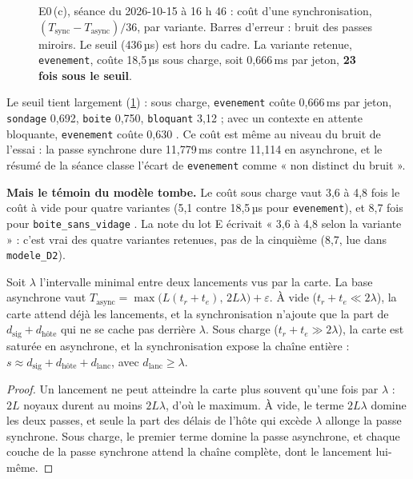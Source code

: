 \begin{figure}[ht]
\centering
\GrapheChmSync
\caption[E0\,(c) : coût d'une synchronisation, à vide et sous charge]{E0\,(c), séance du 2026-10-15 à 16 h 46 \mes : coût d'une synchronisation, $(T_{\mathrm{sync}} - T_{\mathrm{async}})/36$, par variante. Barres d'erreur : bruit des passes miroirs. Le seuil (436\,µs) est hors du cadre. La variante retenue, \texttt{evenement}, coûte 18,5\,µs sous charge, soit 0,666\,ms par jeton, \textbf{23 fois sous le seuil}.}
\label{fig:t2c-sync}
\end{figure}

Le seuil tient largement (\cref{fig:t2c-sync}) : sous charge, \texttt{evenement} coûte 0,666\,ms par jeton, \texttt{sondage} 0,692, \texttt{boite} 0,750, \texttt{bloquant} 3,12 ; avec un contexte en attente bloquante, \texttt{evenement} coûte 0,630 \mes. Ce coût est même au niveau du bruit de l'essai : la passe synchrone dure 11,779\,ms contre 11,114 en asynchrone, et le résumé de la séance classe l'écart de \texttt{evenement} comme « non distinct du bruit ».

\textbf{Mais le témoin du modèle tombe.} Le coût sous charge vaut 3,6 à 4,8 fois le coût à vide pour quatre variantes (5,1 contre 18,5\,µs pour \texttt{evenement}), et 8,7 fois pour \texttt{boite\_\allowbreak sans\_\allowbreak vidage} \mes.  La note du lot E écrivait « 3,6 à 4,8 selon la variante » : c'est vrai des quatre variantes retenues, pas de la cinquième (8,7, lue dans \texttt{modele\_D2}).

\begin{proposition}\label{prop:t2c-d2bis}
Soit $\lambda$ l'intervalle minimal entre deux lancements vus par la carte. La base asynchrone vaut $T_{\mathrm{async}} = \max\bigl(L(t_r + t_e),\, 2L\lambda\bigr) + \varepsilon$. À vide ($t_r + t_e \ll 2\lambda$), la carte attend déjà les lancements, et la synchronisation n'ajoute que la part de $d_{\mathrm{sig}} + d_{\text{hôte}}$ qui ne se cache pas derrière $\lambda$. Sous charge ($t_r + t_e \gg 2\lambda$), la carte est saturée en asynchrone, et la synchronisation expose la chaîne entière : $s \approx d_{\mathrm{sig}} + d_{\text{hôte}} + d_{\mathrm{lanc}}$, avec $d_{\mathrm{lanc}} \ge \lambda$.
\end{proposition}

\begin{proof}
Un lancement ne peut atteindre la carte plus souvent qu'une fois par $\lambda$ : $2L$ noyaux durent au moins $2L\lambda$, d'où le maximum. À vide, le terme $2L\lambda$ domine les deux passes, et seule la part des délais de l'hôte qui excède $\lambda$ allonge la passe synchrone. Sous charge, le premier terme domine la passe asynchrone, et chaque couche de la passe synchrone attend la chaîne complète, dont le lancement lui-même.
\end{proof}

